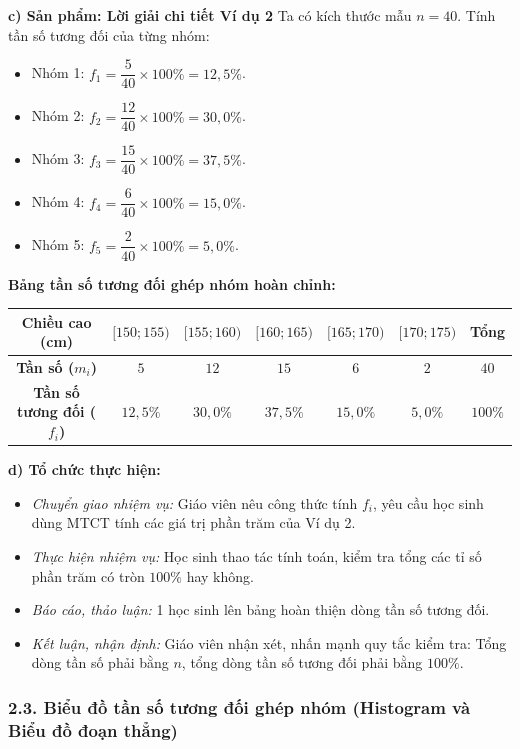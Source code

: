 \documentclass[12pt, a4paper]{article}
\begin{document}
\noindent \textbf{c) Sản phẩm: Lời giải chi tiết Ví dụ 2}
Ta có kích thước mẫu $n = 40$. Tính tần số tương đối của từng nhóm:
\begin{itemize}[leftmargin=0.6cm]
    \item Nhóm 1: $f_1 = \dfrac{5}{40} \times 100\% = 12{,}5\%$.
    \item Nhóm 2: $f_2 = \dfrac{12}{40} \times 100\% = 30{,}0\%$.
    \item Nhóm 3: $f_3 = \dfrac{15}{40} \times 100\% = 37{,}5\%$.
    \item Nhóm 4: $f_4 = \dfrac{6}{40} \times 100\% = 15{,}0\%$.
    \item Nhóm 5: $f_5 = \dfrac{2}{40} \times 100\% = 5{,}0\%$.
\end{itemize}
\textbf{Bảng tần số tương đối ghép nhóm hoàn chỉnh:}
\begin{center}
\small
\begin{tabular}{|c|c|c|c|c|c|c|}
\hline
\textbf{Chiều cao (cm)} & $[150; 155)$ & $[155; 160)$ & $[160; 165)$ & $[165; 170)$ & $[170; 175)$ & \textbf{Tổng} \\ \hline
\textbf{Tần số ($m_i$)} & $5$ & $12$ & $15$ & $6$ & $2$ & $40$ \\ \hline
\textbf{Tần số tương đối ($f_i$)} & $12{,}5\%$ & $30{,}0\%$ & $37{,}5\%$ & $15{,}0\%$ & $5{,}0\%$ & $100\%$ \\ \hline
\end{tabular}
\end{center}

\noindent \textbf{d) Tổ chức thực hiện:}
\begin{itemize}[leftmargin=0.8cm]
    \item \textit{Chuyển giao nhiệm vụ:} Giáo viên nêu công thức tính $f_i$, yêu cầu học sinh dùng MTCT tính các giá trị phần trăm của Ví dụ 2.
    \item \textit{Thực hiện nhiệm vụ:} Học sinh thao tác tính toán, kiểm tra tổng các tỉ số phần trăm có tròn $100\%$ hay không.
    \item \textit{Báo cáo, thảo luận:} 1 học sinh lên bảng hoàn thiện dòng tần số tương đối.
    \item \textit{Kết luận, nhận định:} Giáo viên nhận xét, nhấn mạnh quy tắc kiểm tra: Tổng dòng tần số phải bằng $n$, tổng dòng tần số tương đối phải bằng $100\%$.
\end{itemize}

\subsubsection*{2.3. Biểu đồ tần số tương đối ghép nhóm (Histogram và Biểu đồ đoạn thẳng)}
\end{document}
